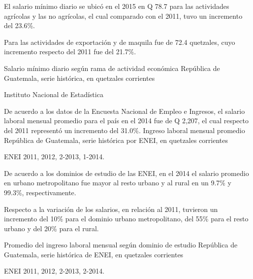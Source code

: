 
{%
El salario mínimo diario se ubicó en el 2015 en Q 78.7 para las actividades agrícolas y las no agrícolas, el cual comparado con el 2011, tuvo un incremento del 23.6\%. 

Para las actividades de exportación y de maquila fue de 72.4 quetzales, cuyo incremento respecto del 2011 fue del 21.7\%. 

}%
{%
 Salario mínimo diario según rama de actividad económica} %
{%
 República de Guatemala, serie histórica, en quetzales corrientes} %
{%
 \begin{tikzpicture}[x=1pt,y=1pt]    \end{tikzpicture}}%
{%
 Instituto Nacional de Estadística} %



%
{%
De acuerdo a los datos de la Encuesta Nacional de Empleo e Ingresos, el salario laboral mensual promedio para el país en el 2014 fue de Q 2,207, el cual respecto del 2011 representó un incremento del 31.0\%. }%
{%
	Ingreso laboral mensual promedio} %
{%
	República de Guatemala, serie histórica por ENEI, en quetzales corrientes} %
{%
	\begin{tikzpicture}[x=1pt,y=1pt]    \end{tikzpicture}}%
{%
	ENEI 2011, 2012, 2-2013, 1-2014.} %



%
{%
De acuerdo a los dominios de estudio de las ENEI, en el 2014 el salario promedio en urbano metropolitano fue mayor al resto urbano y al rural en un 9.7\%  y 99.3\%, respectivamente.

Respecto a la variación de los salarios, en relación al 2011, tuvieron un incremento del 10\% para el dominio urbano metropolitano, del 55\% para el resto urbano y del 20\% para el rural.}%
{%
	Promedio del ingreso laboral mensual según dominio de estudio} %
{%
	República de Guatemala, serie histórica de ENEI, en quetzales corrientes} %
{%
	\begin{tikzpicture}[x=1pt,y=1pt]    \end{tikzpicture}}%
{%
			ENEI 2011, 2012, 2-2013, 2-2014.} %


